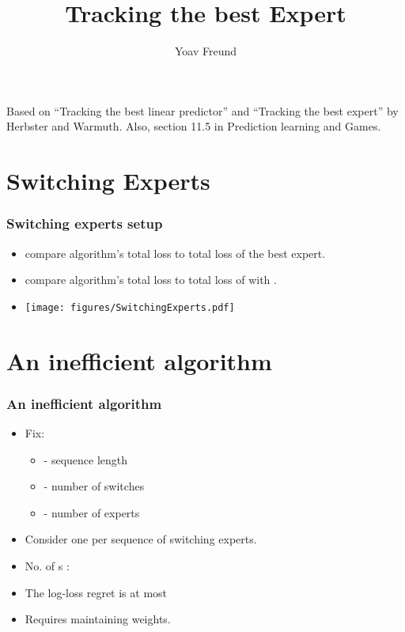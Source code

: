 \documentclass{beamer}
\title %
{Tracking the best Expert}
\author[Freund] %
{Yoav Freund}
\institute[Universities of Somewhere and Elsewhere] %
\begin{document}
%


\begin{frame}
  \titlepage
  Based on ``Tracking the best linear predictor'' and ``Tracking the
  best expert'' by Herbster and Warmuth. Also, section 11.5 in
  Prediction learning and Games.
\end{frame}


\begin{small}




\section{Switching Experts}

\begin{frame}
\frametitle{Switching experts setup}
\begin{itemize}
\item {} compare algorithm's total loss to total
  loss of the best expert.
\item {} compare algorithm's total loss to total
  loss of  with  .
\item
\texttt{[image: figures/SwitchingExperts.pdf]}
\end{itemize}
\end{frame}

\section{An inefficient algorithm}

\begin{frame}
\frametitle{An inefficient algorithm}
\begin{itemize}
\item Fix:
\begin{itemize}
\item {} - sequence length
\item {} - number of switches
\item {} - number of experts
\end{itemize}
\item Consider one  per sequence of switching experts.
\item No. of s : 
\item The log-loss regret is at most 
\item Requires maintaining  weights.
\end{itemize}
\end{frame}


\end{small}
\end{document}
